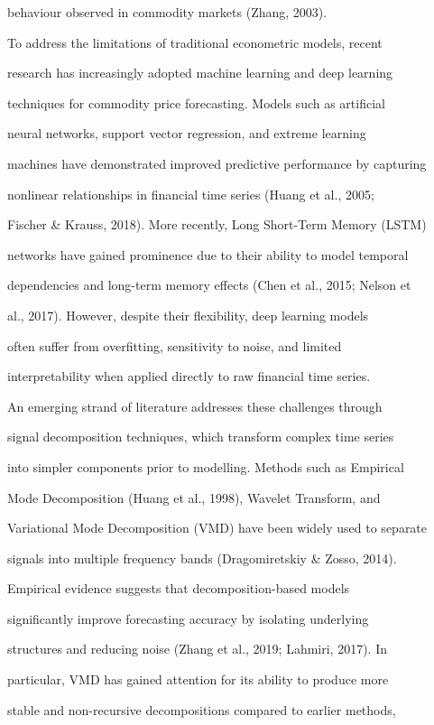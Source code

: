 behaviour observed in commodity markets (Zhang, 2003).



To address the limitations of traditional econometric models, recent

research has increasingly adopted machine learning and deep learning

techniques for commodity price forecasting. Models such as artificial

neural networks, support vector regression, and extreme learning

machines have demonstrated improved predictive performance by capturing

nonlinear relationships in financial time series (Huang et al., 2005;

Fischer \& Krauss, 2018). More recently, Long Short-Term Memory (LSTM)

networks have gained prominence due to their ability to model temporal

dependencies and long-term memory effects (Chen et al., 2015; Nelson et

al., 2017). However, despite their flexibility, deep learning models

often suffer from overfitting, sensitivity to noise, and limited

interpretability when applied directly to raw financial time series.



An emerging strand of literature addresses these challenges through

signal decomposition techniques, which transform complex time series

into simpler components prior to modelling. Methods such as Empirical

Mode Decomposition (Huang et al., 1998), Wavelet Transform, and

Variational Mode Decomposition (VMD) have been widely used to separate

signals into multiple frequency bands (Dragomiretskiy \& Zosso, 2014).

Empirical evidence suggests that decomposition-based models

significantly improve forecasting accuracy by isolating underlying

structures and reducing noise (Zhang et al., 2019; Lahmiri, 2017). In

particular, VMD has gained attention for its ability to produce more

stable and non-recursive decompositions compared to earlier methods,

